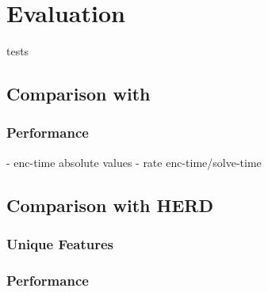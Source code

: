 \chapter{Evaluation}
\label{ch:eval}

tests


\section{Comparison with \porthos{}}

\subsection{Performance}

- enc-time absolute values
- rate enc-time/solve-time



\section{Comparison with HERD}

\subsection{Unique Features}

\subsection{Performance}

